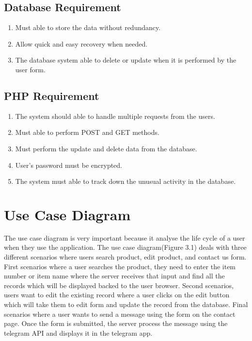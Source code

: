 \subsection{Database Requirement}
\begin{enumerate}
    \item Must able to store the data without redundancy.
    \item Allow quick and easy recovery when needed.
    \item The database system able to delete or update when it is performed by the user form.
\end{enumerate}

\subsection{PHP Requirement}
\begin{enumerate}
    \item The system should able to handle multiple requests from the users.
    \item Must able to perform POST and GET methods.
    \item Must perform the update and delete data from the database.
    \item User's password must be encrypted.
    \item The system must able to track down the unusual activity in the database.
\end{enumerate}

\section{Use Case Diagram}
The use case diagram is very important because it analyse the life cycle of a user when they use the application. The use case diagram(Figure 3.1) deals with three different scenarios where users search product, edit product, and contact us form. First scenarios where a user searches the product, they need to enter the item number or item name where the server receives that input and find all the records which will be displayed backed to the user browser. Second scenarios, users want to edit the existing record where a user clicks on the edit button which will take them to edit form and update the record from the database. Final scenarios where a user wants to send a message using the form on the contact page. Once the form is submitted, the server process the message using the telegram API and displays it in the telegram app.

